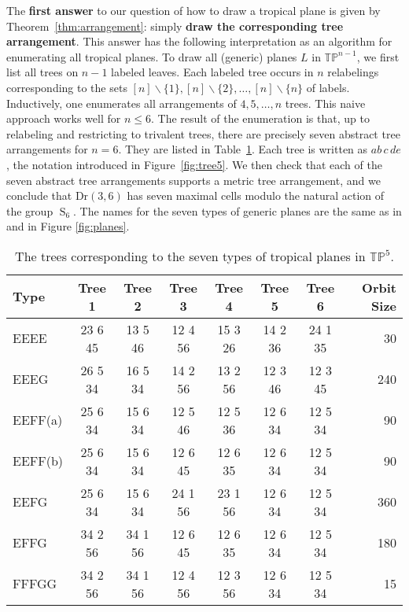 \documentclass[12pt,a4paper]{amsart}
\theoremstyle{definition}
\newcommand{\Dr}{{\mathrm{Dr}}}
\newcommand{\TP}{{\mathbb{TP}}}
\providecommand{\Sym}{\operatorname{S}}
\begin{document}
The \textbf{first answer} to our question of how to draw a tropical
plane is given by Theorem~\ref{thm:arrangement}: simply \textbf{draw
  the corresponding tree arrangement}.  This answer has the following
interpretation as an algorithm for enumerating all tropical planes.
To draw all (generic) planes $L$ in $\TP^{n-1}$, we first list all
trees on $n-1$ labeled leaves.  Each labeled tree occurs in $n$
relabelings corresponding to the sets
$[n]\backslash\{1\},[n]\backslash\{2\},\dots,[n]\backslash\{n\}$ of
labels.  Inductively, one enumerates all arrangements of $4,5,\dots,n$
trees.  This naive approach works well for $n\le 6$. The result of the
enumeration is that, up to relabeling and restricting to trivalent
trees, there are precisely seven abstract tree arrangements for $n=6$.
They are listed in Table~\ref{tab:trees}.  Each tree is written as
$ab\,c\, de$, the notation introduced in Figure~\ref{fig:tree5}.  We
then check that each of the seven abstract tree arrangements supports
a metric tree arrangement, and we conclude that $\Dr(3,6)$ has seven
maximal cells modulo the natural action of the group $\Sym_6$.  The
names for the seven types of generic planes are the same as in
\cite[\S 5]{SS} and in Figure \ref{fig:planes}.

\begin{table}[hbt]\centering
  \caption{The trees corresponding to the seven types of tropical planes in $\TP^5$.}
  \renewcommand{\arraystretch}{0.9}
  \begin{tabular*}{.9\linewidth}{@{\extracolsep{\fill}}lccccccr@{}}
    \toprule
    Type&Tree 1&Tree 2&Tree 3&Tree 4&Tree 5&Tree 6&Orbit Size\\
    \midrule
    EEEE&23 6 45&13 5 46&12 4 56&15 3 26&14 2 36&24 1 35&30\\
    EEEG&26 5 34&16 5 34&14 2 56&13 2 56&12 3 46&12 3 45&240\\
    EEFF(a)&25 6 34&15 6 34&12 5 46&12 5 36&12 6 34&12 5 34&90\\
    EEFF(b)&25 6 34&15 6 34&12 6 45&12 6 35&12 6 34&12 5 34&90\\
    EEFG&25 6 34&15 6 34& 24 1 56&23 1 56&12 6 34&12 5 34&360\\
    EFFG&34 2 56&34 1 56&12 6 45&12 6 35&12 6 34&12 5 34&180\\
    FFFGG&34 2 56&34 1 56&12 4 56&12 3 56&12 6 34&12 5 34&15\\
    \bottomrule
  \end{tabular*}
  \label{tab:trees}
\end{table}
\end{document}
